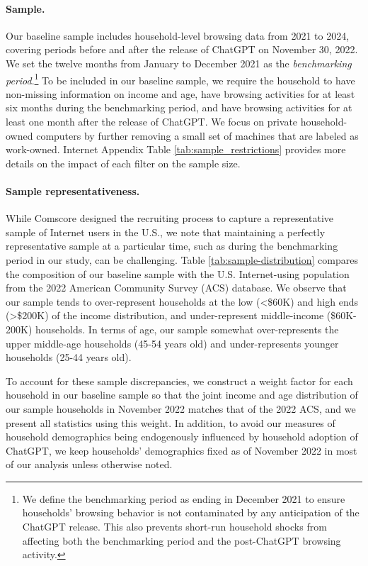 \documentclass[12pt]{article}
\begin{document}
\paragraph{Sample.} Our baseline sample includes household-level browsing data from 2021 to 2024, covering periods before and after the release of ChatGPT on November 30, 2022. We set the twelve months from January to December 2021 as the \textit{benchmarking period}.\footnote{We define the benchmarking period as ending in December 2021 to ensure households' browsing behavior is not contaminated by any anticipation of the ChatGPT release. This also prevents short-run household shocks from affecting both the benchmarking period and the post-ChatGPT browsing activity.}  To be included in our baseline sample, we require the household to have non-missing information on income and age, have browsing activities for at least six months during the benchmarking period, and have browsing activities for at least one month after the release of ChatGPT. We focus on private household-owned computers by further removing a small set of machines that are labeled as work-owned. Internet Appendix Table \ref{tab:sample_restrictions} provides more details on the impact of each filter on the sample size.


\paragraph{Sample representativeness.} While Comscore designed the recruiting process to capture a representative sample of Internet users in the U.S., we note that maintaining a perfectly representative sample at a particular time, such as during the benchmarking period in our study, can be challenging. Table \ref{tab:sample-distribution} compares the composition of our baseline sample with the U.S. Internet-using population from the 2022 American Community Survey (ACS) database. We observe that our sample tends to over-represent households at the low (<\$60K) and high ends (>\$200K) of the income distribution, and under-represent middle-income (\$60K-200K) households. In terms of age, our sample somewhat over-represents the upper middle-age households (45-54 years old) and under-represents younger households (25-44 years old). 

To account for these sample discrepancies, we construct a weight factor for each household in our baseline sample so that the joint income and age distribution of our sample households in November 2022 matches that of the 2022 ACS, and we present all statistics using this weight. In addition, to avoid our measures of household demographics being endogenously influenced by household adoption of ChatGPT, we keep households' demographics fixed as of November 2022 in most of our analysis unless otherwise noted. 
\end{document}
